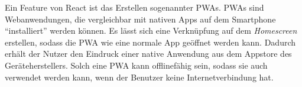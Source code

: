Ein Feature von React ist das Erstellen sogenannter \acp{PWA}.
\aclp{PWA} sind Webanwendungen, die vergleichbar mit nativen Apps auf dem Smartphone \enquote{installiert} werden können.
Es lässt sich eine Verknüpfung auf dem \emph{Homescreen} erstellen, sodass die \acs{PWA} wie eine normale App geöffnet werden kann.
Dadurch erhält der Nutzer den Eindruck einer native Anwendung aus dem Appstore des Geräteherstellers.
Solch eine \ac{PWA} kann offlinefähig sein, sodass sie auch verwendet werden kann, wenn der Benutzer keine Internetverbindung hat. \autocite[Vgl.][]{hartmann2019react}
